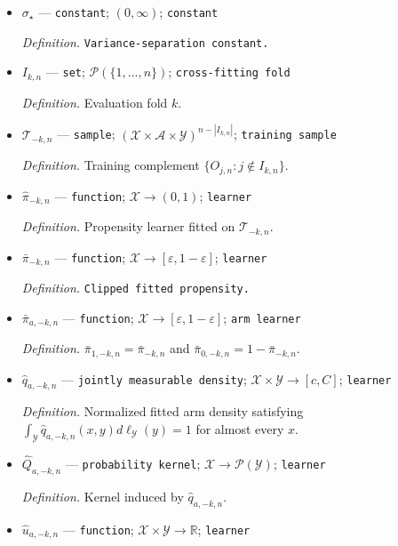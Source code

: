 \documentclass{article}
\begin{document}
\begin{itemize}
  \par\smallskip\noindent\emph{Definition.} \texttt{Clipped-\allowbreak{}propensity learning exponent.}
  \item \(\sigma_\star\) --- \texttt{constant}; \((0,\infty)\); \texttt{constant}
  \par\smallskip\noindent\emph{Definition.} \texttt{Variance-\allowbreak{}separation constant.}
  \item \(I_{k,n}\) --- \texttt{set}; \(\mathcal P(\{1,\ldots,n\})\); \texttt{cross-\allowbreak{}fitting fold}
  \par\smallskip\noindent\emph{Definition.} Evaluation fold \(k\).
  \item \(\mathcal T_{-k,n}\) --- \texttt{sample}; \((\mathcal X\times\mathcal A\times\mathcal Y)^{n-|I_{k,n}|}\); \texttt{training sample}
  \par\smallskip\noindent\emph{Definition.} Training complement \(\{O_{j,n}:j\notin I_{k,n}\}\).
  \item \(\widehat\pi_{-k,n}\) --- \texttt{function}; \(\mathcal X\to(0,1)\); \texttt{learner}
  \par\smallskip\noindent\emph{Definition.} Propensity learner fitted on \(\mathcal T_{-k,n}\).
  \item \(\bar\pi_{-k,n}\) --- \texttt{function}; \(\mathcal X\to[\varepsilon,1-\varepsilon]\); \texttt{learner}
  \par\smallskip\noindent\emph{Definition.} \texttt{Clipped fitted propensity.}
  \item \(\bar\pi_{a,-k,n}\) --- \texttt{function}; \(\mathcal X\to[\varepsilon,1-\varepsilon]\); \texttt{arm learner}
  \par\smallskip\noindent\emph{Definition.} \(\bar\pi_{1,-k,n}=\bar\pi_{-k,n}\) and \(\bar\pi_{0,-k,n}=1-\bar\pi_{-k,n}\).
  \item \(\widehat q_{a,-k,n}\) --- \texttt{jointly measurable density}; \(\mathcal X\times\mathcal Y\to[c,C]\); \texttt{learner}
  \par\smallskip\noindent\emph{Definition.} Normalized fitted arm density satisfying \(\int_{\mathcal Y}\widehat q_{a,-k,n}(x,y)d\ell_{\mathcal Y}(y)=1\) for almost every \(x\).
  \item \(\widehat Q_{a,-k,n}\) --- \texttt{probability kernel}; \(\mathcal X\to\mathcal P(\mathcal Y)\); \texttt{learner}
  \par\smallskip\noindent\emph{Definition.} Kernel induced by \(\widehat q_{a,-k,n}\).
  \item \(\widehat u_{a,-k,n}\) --- \texttt{function}; \(\mathcal X\times\mathcal Y\to\mathbb R\); \texttt{learner}

\end{itemize}
\end{document}
